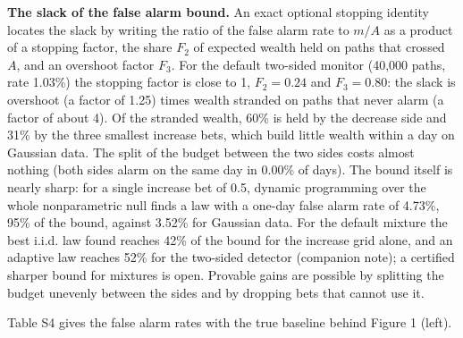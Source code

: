 \documentclass[
]{article}
\begin{document}
\textbf{The slack of the false alarm bound.} An exact optional stopping
identity locates the slack by writing the ratio of the false alarm rate
to \(m/A\) as a product of a stopping factor, the share \(F_2\) of
expected wealth held on paths that crossed \(A\), and an overshoot
factor \(F_3\). For the default two-sided monitor (40,000 paths, rate
1.03\%) the stopping factor is close to 1, \(F_2 = 0.24\) and
\(F_3 = 0.80\): the slack is overshoot (a factor of 1.25) times wealth
stranded on paths that never alarm (a factor of about 4). Of the
stranded wealth, 60\% is held by the decrease side and 31\% by the three
smallest increase bets, which build little wealth within a day on
Gaussian data. The split of the budget between the two sides costs
almost nothing (both sides alarm on the same day in 0.00\% of days). The
bound itself is nearly sharp: for a single increase bet of 0.5, dynamic
programming over the whole nonparametric null finds a law with a one-day
false alarm rate of 4.73\%, 95\% of the bound, against 3.52\% for
Gaussian data. For the default mixture the best i.i.d. law found reaches
42\% of the bound for the increase grid alone, and an adaptive law
reaches 52\% for the two-sided detector (companion note); a certified
sharper bound for mixtures is open. Provable gains are possible by
splitting the budget unevenly between the sides and by dropping bets
that cannot use it.

Table S4 gives the false alarm rates with the true baseline behind
Figure 1 (left).
\end{document}
